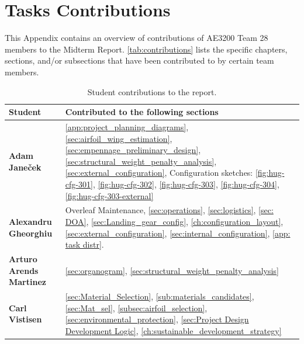 \chapter{Tasks Contributions}
\label{app: task distr}

This Appendix contains an overview of contributions of AE3200 Team 28 members to the Midterm Report. \autoref{tab:contributions} lists the specific chapters, sections, and/or subsections that have been contributed to by certain team members.

\begin{table}[H]
    \centering
    \small
    \setlength{\tabcolsep}{4pt}
    \renewcommand{\arraystretch}{1.2}
    \caption{Student contributions to the report.}
    \label{tab:contributions}

    \begin{tabularx}{\textwidth}{|>{\raggedright\arraybackslash}p{}|>{\raggedright\arraybackslash}X|}
        \hline 
        \textbf{Student} & \textbf{Contributed to the following sections} \\
        \hline \hline 

        \textbf{Adam Janeček} 
        & \autoref{app:project_planning_diagrams}, \autoref{sec:airfoil_wing_estimation}, \autoref{sec:empennage_preliminary_design}, \autoref{sec:structural_weight_penalty_analysis}, \autoref{sec:external_configuration}, Configuration sketches: \autoref{fig:hug-cfg-301}, \autoref{fig:hug-cfg-302}, \autoref{fig:hug-cfg-303}, \autoref{fig:hug-cfg-304}, \autoref{fig:hug-cfg-303-external}\\
        \hline 

        \textbf{Alexandru Gheorghiu} 
        & Overleaf Maintenance,
        \autoref{sec:operations},
        \autoref{sec:logistics},
        \autoref{sec: DOA},
        \autoref{sec:Landing_gear_config},
        \autoref{ch:configuration_layout},
        \autoref{sec:external_configuration},
        \autoref{sec:internal_configuration},
        \autoref{app: task distr}.\\
        \hline 

        \textbf{Arturo Arends Martinez}  
        & \autoref{sec:organogram}, \autoref{sec:structural_weight_penalty_analysis}\\
        \hline 

        \textbf{Carl Vistisen} 
        &  \autoref{sec:Material_Selection}, \autoref{sub:materials_candidates}, \autoref{sec:Mat_sel}, \autoref{subsec:airfoil_selection}, \autoref{sec:environmental_protection}, \autoref{sec:Project Design Development Logic}, \autoref{ch:sustainable_development_strategy}\\
        \hline 


\end{tabularx}
\end{table}
